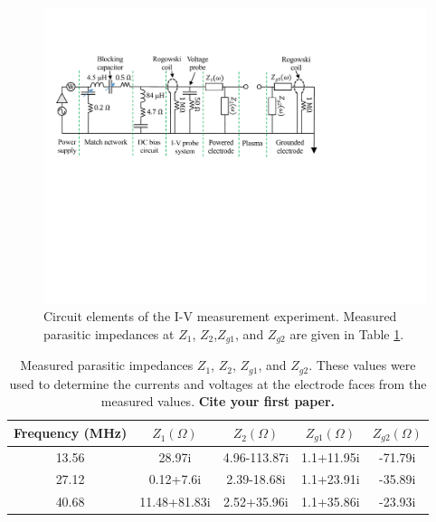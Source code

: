\documentclass[12pt]{iopart}
\begin{document}
\begin{figure}[ht!]
\begin{center}
\includegraphics[width=.99\textwidth]{mGEC_Circuit.pdf}
	\caption{Circuit elements of the I-V measurement experiment. Measured parasitic impedances at $Z_1$, $Z_2$,$Z_{g1}$, and $Z_{g2}$ are given in Table \ref{tab:Measured_impedance}.} 
	\label{Fig:mGEC_Circuit}
\end{center}
\end{figure}

\begin{table}[]
    \centering
    \begin{tabular}{|c|c|c|c|c|}
        \hline
        Frequency (MHz) & $Z_1 (\Omega)$ & $Z_2 (\Omega)$ & $Z_{g1} (\Omega)$ & $Z_{g2} (\Omega)$ \\
        \hline
        13.56 & 28.97i & 4.96-113.87i & 1.1+11.95i & -71.79i\\
        27.12 & 0.12+7.6i & 2.39-18.68i & 1.1+23.91i & -35.89i \\
        40.68 & 11.48+81.83i & 2.52+35.96i & 1.1+35.86i & -23.93i \\
        \hline
    \end{tabular}
    \caption{Measured parasitic impedances $Z_1$, $Z_2$, $Z_{g1}$, and $Z_{g2}$.  These values were used to determine the currents and voltages at the electrode faces from the measured values. \textbf{Cite your first paper.}}
    \label{tab:Measured_impedance}
\end{table}
\end{document}
